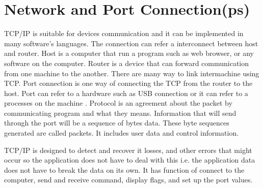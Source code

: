 \section{Network and Port Connection(ps)}

TCP/IP is suitable for devices communication and it can be implemented in many software's languages.
The connection can refer a interconnect between host and router.
Host is a computer that run a program such as web browser, or any software on the computer\cite{davidB}.
Router is a device that can forward communication from one machine to the another.
There are many way to link intermachine using TCP.
Port connection is one way of connecting the TCP from the router to the host.
Port can refer to a hardware such as USB connection or it can refer to a processes on the machine \cite{normanM}.
Protocol is an agreement about the packet by communicating program and what they means.
Information that will send through the port will be a sequence of bytes data. 
These byte sequences generated are called packets\cite{davidB}.
It includes user data and control information.

TCP/IP is designed to detect and recover it losses, and other errors that might occur so the application does not have to deal with this \cite{davidB} i.e. the application data does not have to break the data on its own. It has function of connect to the computer, send and receive command, display flags, and set up the port values.


 